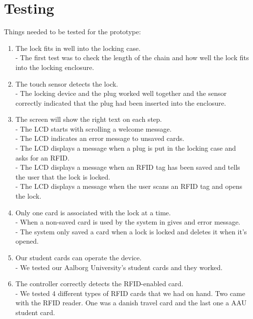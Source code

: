 \section{Testing}

Things needed to be tested for the prototype:

\begin{enumerate}
	
	\item The lock fits in well into the locking case.\\
		- The first test was to check the length of the chain and how well the lock fits into the locking enclosure.\\
	\item The touch sensor detects the lock.\\
		- The locking device and the plug worked well together and the sensor correctly indicated that the plug had been inserted into the enclosure.\\
	\item The screen will show the right text on each step.\\
		- The LCD starts with scrolling a welcome message. \\
		- The LCD indicates an error message to unsaved cards.\\
		- The LCD displays a message when a plug is put in the locking case and asks for an RFID.\\
		- The LCD displays a message when an RFID tag has been saved and tells the user that the lock is locked.\\
		- The LCD displays a message when the user scans an RFID tag and opens the lock.\\
	\item Only one card is associated with the lock at a time.\\
		- When a non-saved card is used by the system in gives and error message.\\
		- The system only saved a card when a lock is locked and deletes it when it's opened.\\
	\item Our student cards can operate the device.\\
		- We tested our Aalborg University's student cards and they worked.\\
	\item The controller correctly detects the RFID-enabled card.\\
		- We tested 4 different types of RFID cards that we had on hand. Two came with the RFID reader. One was a danish travel card and the last one a AAU student card.\\
	
\end{enumerate}



